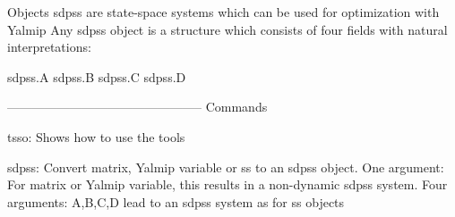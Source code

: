Objects sdpss are state-space systems which can be used for optimization with Yalmip
Any sdpss object is a structure which consists of four fields with natural interpretations:

sdpss.A
sdpss.B
sdpss.C
sdpss.D

-----------------------------------------------
Commands

tsso:   Shows how to use the tools

sdpss:  Convert matrix, Yalmip variable or ss to an sdpss object.
        One argument: For matrix or Yalmip variable, this results in a non-dynamic sdpss system.
        Four arguments: A,B,C,D lead to an sdpss system as for ss objects


